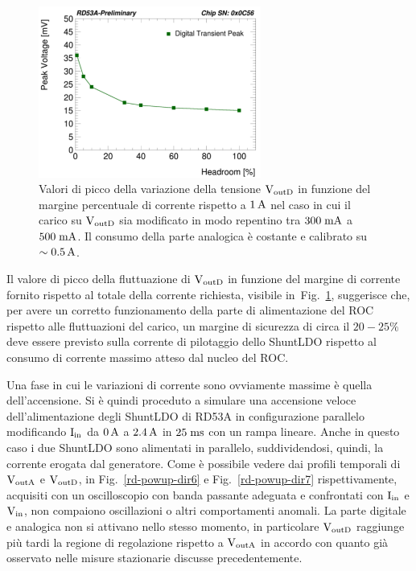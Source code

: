 \begin{figure}
\centering
\includegraphics[width=0.65\textwidth]{Immagini/LoadTransientDominik}
\caption{Valori di picco della variazione della tensione $\mathrm{V_{outD}}$ in funzione del margine percentuale di corrente rispetto a $1\rm \, A$ nel caso in cui il carico su $\mathrm{V_{outD}}$ sia modificato in modo repentino tra $300\rm \; mA$ a $500\rm \; mA$. Il consumo della parte analogica \`e costante e calibrato su $\sim 0.5\rm \, A$. 
}
\label{LoadTransient}
\end{figure}
Il valore di picco della fluttuazione di $\mathrm{V_{outD}}$ in funzione del margine di corrente fornito rispetto al totale della corrente richiesta, visibile in~Fig.~\ref{LoadTransient}, suggerisce che, per avere un corretto funzionamento della parte di alimentazione del ROC rispetto alle fluttuazioni del carico, un margine di sicurezza di circa il $20-25
\%$ deve essere previsto sulla corrente di pilotaggio dello ShuntLDO rispetto al consumo di corrente massimo atteso dal nucleo del ROC. 

Una fase in cui le variazioni di corrente sono ovviamente massime \`e quella dell'accensione. Si è quindi proceduto a simulare una accensione veloce dell'alimentazione degli ShuntLDO  di RD53A in configurazione parallelo modificando $\mathrm{I_{in}}$ da $0\rm \, A$ a $2.4\rm \, A$ in $25\; \rm m \rm s$ con un rampa lineare. Anche in questo caso i due ShuntLDO sono alimentati in parallelo, suddividendosi, quindi, la corrente erogata dal generatore. Come è possibile vedere dai profili temporali di $\mathrm{V_{outA}}$ e $\mathrm{V_{outD}}$, in Fig.~\ref{rd-powup-dir6} e Fig.~\ref{rd-powup-dir7} rispettivamente, acquisiti con un oscilloscopio con banda passante adeguata e confrontati con $\mathrm{I_{in}}$ e $\mathrm{V_{in}}$, non compaiono oscillazioni o altri comportamenti anomali.
La parte digitale e analogica non si attivano nello stesso momento, in particolare $\mathrm{V_{outD}}$ raggiunge pi\`u tardi la regione di regolazione rispetto a $\mathrm{V_{outA}}$ in accordo con quanto gi\`a osservato nelle misure stazionarie discusse precedentemente.

